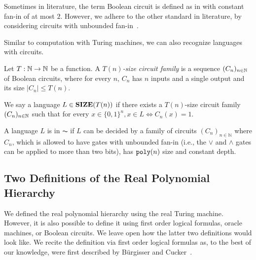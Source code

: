 \documentclass{article}
\begin{document}
\begin{remark}
Sometimes in literature, the term Boolean circuit is defined as in  with constant fan-in of at most $2$.
However, we adhere to the other standard in literature, by considering circuits with unbounded fan-in~\cite{AB09}.
\end{remark}

Similar to computation with Turing machines, we can also recognize languages with circuits.

\begin{definition}
\label{def:CircuitFamily}
Let $T: \mathbb{N} \rightarrow \mathbb{N}$ be a function. A \emph{$T(n)$-size circuit family} is a sequence $(C_n)_{n \in \mathbb{N}}$ of Boolean circuits, where for every $n$, $C_n$ has $n$ inputs and a single output and its size $|C_n| \leq T(n)$.

We say a language $L \in \mathbf{SIZE}(T(n))$ if there exists a $T(n)$-size circuit family $(C_n)_{n \in \mathbb{N}}$ such that for every $x \in \{0,1\}^n, x \in L \iff C_n(x)=1$.
\end{definition}



\begin{definition}
\label{def:AC0circuits}
A language $L$ is in $\AC$ if $L$ can be decided by a family of circuits $(C_n)_{n \in \mathbb{N}}$ where $C_n$, which is allowed to have gates with unbounded fan-in (i.e., the $\lor$ and $\land$ gates can be applied to more than two bits), has $\texttt{poly}(n)$ size and constant depth.
\end{definition}

\subsection{Two Definitions of the Real Polynomial Hierarchy}
\label{sub:TwoRPH-Definitions}
We defined the real polynomial hierarchy using the real Turing machine.
However, it is also possible to define it using first order logical formulas, oracle machines, or Boolean circuits.
We leave open how the latter two definitions would look like.
We recite the definition via first order logical formulas as, to the best of our knowledge, were first described by B\"urgisser and Cucker~\cite{BC09}.
\end{document}
